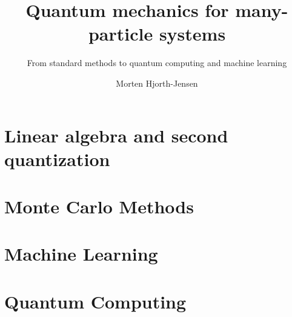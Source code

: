\documentclass[graybox,envcountchap,sectrefs]{svmono}
\begin{document}
\author{Morten Hjorth-Jensen}
\title{Quantum mechanics for many-particle systems}
\subtitle{From standard methods to quantum computing and machine learning}
\maketitle

\frontmatter%






\tableofcontents




\mainmatter%
         \part{Linear algebra and second quantization}
         
 \clearemptydoublepage
         
 \clearemptydoublepage
      
 \clearemptydoublepage
      
 \clearemptydoublepage
        \part{Monte Carlo Methods}
        \part{Machine Learning}
         \part{Quantum Computing}   

 

\backmatter%
%
%
\printindex
\end{document}
